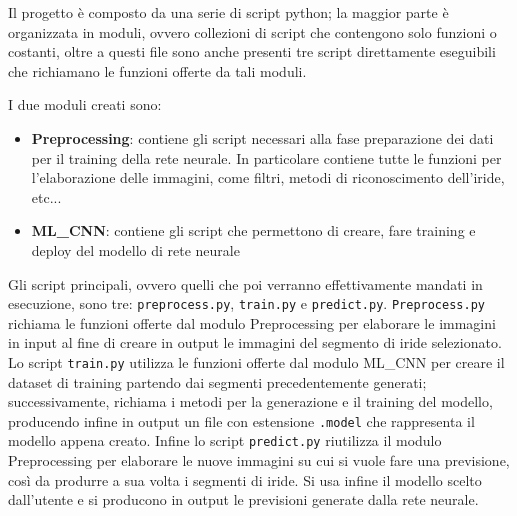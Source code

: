 Il progetto è composto da una serie di script python; la maggior parte è organizzata in moduli, ovvero collezioni di script che contengono solo funzioni o costanti, oltre a questi file sono anche presenti tre script direttamente eseguibili che richiamano le funzioni offerte da tali moduli.

I due moduli creati sono:
\begin{itemize}
  \item \textbf{Preprocessing}: contiene gli script necessari alla fase preparazione dei dati per il training della rete neurale. In particolare contiene tutte le funzioni per l’elaborazione delle immagini, come filtri, metodi di riconoscimento dell’iride, etc...
  \item \textbf{ML\_CNN}:  contiene gli script che permettono di creare, fare training e deploy del modello di rete neurale  
\end{itemize}

Gli script principali, ovvero quelli che poi verranno effettivamente mandati in esecuzione,  sono tre: \texttt{preprocess.py}, \texttt{train.py} e \texttt{predict.py}. \texttt{Preprocess.py} richiama le funzioni offerte dal modulo Preprocessing per elaborare le immagini in input al fine di  creare in output le immagini del segmento di iride selezionato. Lo script \texttt{train.py} utilizza le funzioni offerte dal modulo ML\_CNN per creare il dataset di training partendo dai segmenti precedentemente generati; successivamente, richiama i metodi per la generazione e il training del modello, producendo infine in output un file con estensione \texttt{.model} che rappresenta il modello appena creato. Infine lo script \texttt{predict.py} riutilizza il modulo Preprocessing per elaborare le nuove immagini su cui si vuole fare una previsione, così da produrre a sua volta i segmenti di iride. Si usa infine il modello scelto dall’utente e si producono in output le previsioni  generate dalla rete neurale.
